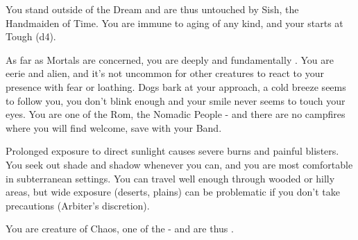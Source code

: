 \begin{multicols*}{2}
  You stand outside of the Dream and are thus untouched by Sish, the Handmaiden of Time. You are immune to aging of any kind, and your \DEATH starts at Tough (d4).

\newpage




  As far as Mortals are concerned, you are deeply and fundamentally . You are eerie and alien, and it's not uncommon for other creatures to react to your presence with fear or loathing. Dogs bark at your approach, a cold breeze seems to follow you, you don't blink enough and your smile never seems to touch your eyes. You are one of the Rom, the Nomadic People - and there are no campfires where you will find welcome, save with your Band.




  Prolonged exposure to direct sunlight causes severe burns and painful blisters.  You seek out shade and shadow whenever you can, and you are most comfortable in subterranean settings.  You can travel well enough through wooded or hilly areas, but wide exposure (deserts, plains) can be problematic if you don't take precautions (Arbiter's discretion).

    
  You are creature of Chaos, one of the  - and are thus .

\cbreak



\end{multicols*}
